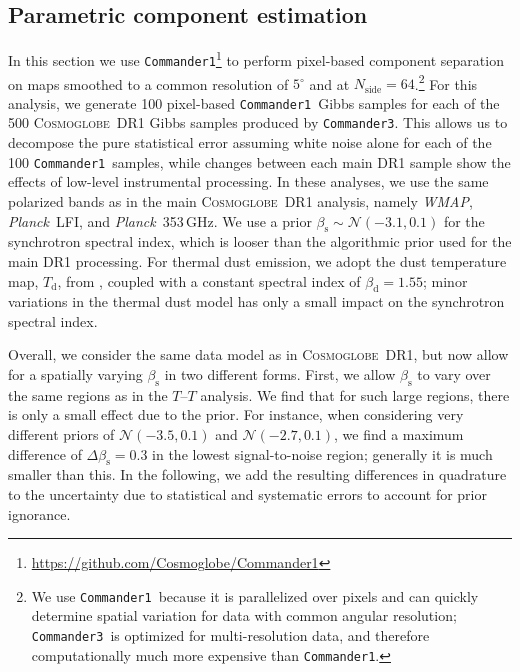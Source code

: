 \documentclass[twocolumn]{../../common/aa}
\def\WMAP{\emph{WMAP}}
\def\Planck{\emph{Planck}}
\def\commanderone{\texttt{Commander1}}
\def\commanderthree{\texttt{Commander3}}
\newcommand{\cosmoglobe}{\textsc{Cosmoglobe}}
\begin{document}


\subsection{Parametric component estimation}
\label{sec:comm1}

In this section we use \commanderone\footnote{\url{https://github.com/Cosmoglobe/Commander1}} to perform pixel-based component separation on maps smoothed to a common resolution of $5^\circ$ and at $N_\mathrm{side}=64$.\footnote{We use \commanderone\ because it is parallelized over pixels and can quickly determine spatial variation for data with common angular resolution; \commanderthree\ is optimized for multi-resolution data, and therefore computationally much more expensive than \commanderone.}
For this analysis, we generate 100 pixel-based \commanderone\ Gibbs samples for each of the 500 \cosmoglobe\ DR1 Gibbs samples produced by \commanderthree. This allows us to decompose the pure statistical error assuming white noise alone for each of the 100 \commanderone\ samples, while changes between each main DR1 sample show the effects of low-level instrumental processing. In these analyses, we use the same polarized bands as in the main \cosmoglobe\ DR1 analysis, namely \WMAP, \Planck\ LFI, and \Planck\ 353\,GHz. We use a prior $\beta_\mathrm s\sim\mathcal N(-3.1, 0.1)$ for the synchrotron spectral index, which is looser than the algorithmic prior used for the main DR1 processing. For thermal dust emission, we adopt the dust temperature map, $T_\mathrm d$, from \citet{planck2014-a12}, coupled with a constant spectral index of $\beta_\mathrm d=1.55$; minor variations in the thermal dust model has only a small impact on the synchrotron spectral index.

Overall, we consider the same data model as in \cosmoglobe\ DR1, but now allow for a spatially varying $\beta_\mathrm s$ in two different forms.
First, we allow $\beta_\mathrm s$ to vary over the same regions as in the $T$--$T$ analysis.
We find that for such large regions, there is only a small effect due to the prior. For instance, when considering very different priors of $\mathcal N(-3.5,0.1)$ and $\mathcal N(-2.7, 0.1)$, we find a maximum difference of $\Delta\beta_{\mathrm{s}}=0.3$ in the lowest signal-to-noise region; generally it is much smaller than this. In the following, we add the resulting differences in quadrature to the uncertainty due to statistical and systematic errors to account for prior ignorance. 
\end{document}
